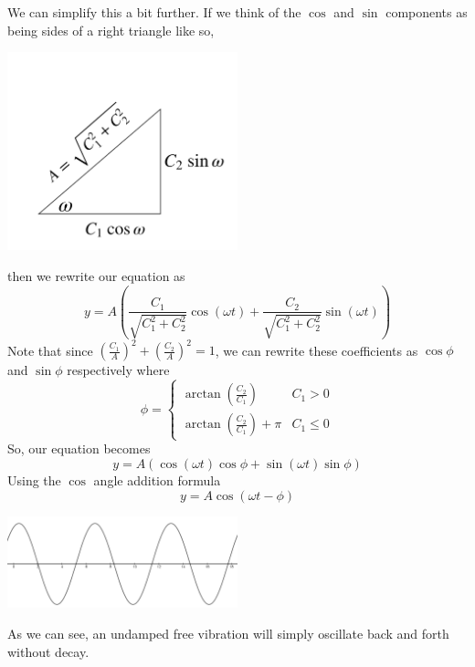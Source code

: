 \noindent
We can simplify this a bit further. If we think of the $\cos$ and $\sin$ components as being sides of a right triangle like so,
\begin{center}
	\includegraphics[width=0.5\textwidth]{./higherOrder/freeVibrs/triangle.png}
\end{center}
then we rewrite our equation as
\begin{equation*}
	y = A\left( \frac{C_1}{\sqrt{C_1^2 + C_2^2}}\cos{(\omega t)} + \frac{C_2}{\sqrt{C_1^2 + C_2^2}}\sin{(\omega t)} \right)
\end{equation*}
Note that since $\left(\frac{C_1}{A}\right)^2 + \left(\frac{C_2}{A}\right)^2 = 1$, we can rewrite these coefficients as $\cos{\phi}$ and $\sin{\phi}$ respectively where
\begin{equation*}
	\phi = \begin{cases}
		\arctan{(\frac{C_2}{C_1})} & C_1 > 0 \\
		\arctan{(\frac{C_2}{C_1})} + \pi & C_1 \leq 0
	\end{cases}
\end{equation*} 
So, our equation becomes
\begin{equation*}
	y = A\left(\cos{(\omega t)}\cos{\phi} + \sin{(\omega t)}\sin{\phi}\right)
\end{equation*}
Using the $\cos$ angle addition formula
\begin{equation*}
	y = A\cos{(\omega t - \phi)}
\end{equation*}
\begin{center}
	\includegraphics[width=0.5\textwidth]{./higherOrder/freeVibrs/undampedfree.png}
\end{center}
As we can see, an undamped free vibration will simply oscillate back and forth without decay.

